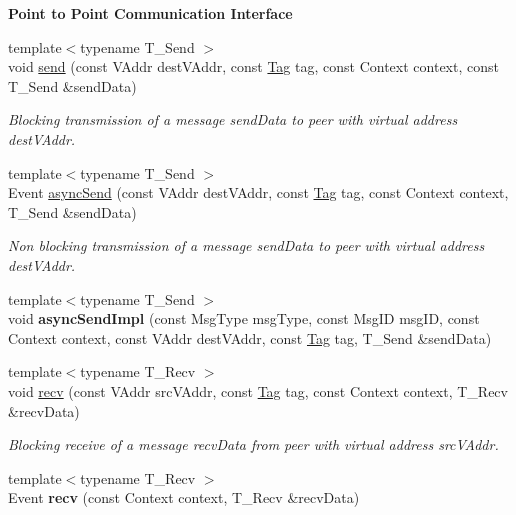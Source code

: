 \begin{Indent}{\bf Point to Point Communication Interface}\par
\begin{DoxyCompactItemize}
\item 
{\footnotesize template$<$typename T\+\_\+\+Send $>$ }\\void \hyperlink{structgraybat_1_1communicationPolicy_1_1ZMQ_a0b0b0a5a6f6b5c85a6c5b5b31fae6b1f}{send} (const V\+Addr dest\+V\+Addr, const \hyperlink{structTag}{Tag} tag, const Context context, const T\+\_\+\+Send \&send\+Data)
\begin{DoxyCompactList}\small\item\em Blocking transmission of a message send\+Data to peer with virtual address dest\+V\+Addr. \end{DoxyCompactList}\item 
{\footnotesize template$<$typename T\+\_\+\+Send $>$ }\\Event \hyperlink{structgraybat_1_1communicationPolicy_1_1ZMQ_a90e4cec7521e061aa682559d8bc72f1b}{async\+Send} (const V\+Addr dest\+V\+Addr, const \hyperlink{structTag}{Tag} tag, const Context context, T\+\_\+\+Send \&send\+Data)
\begin{DoxyCompactList}\small\item\em Non blocking transmission of a message send\+Data to peer with virtual address dest\+V\+Addr. \end{DoxyCompactList}\item 
\hypertarget{structgraybat_1_1communicationPolicy_1_1ZMQ_aba035ac9e25e20c89581c2e9ebdcf477}{}{\footnotesize template$<$typename T\+\_\+\+Send $>$ }\\void {\bfseries async\+Send\+Impl} (const Msg\+Type msg\+Type, const Msg\+I\+D msg\+I\+D, const Context context, const V\+Addr dest\+V\+Addr, const \hyperlink{structTag}{Tag} tag, T\+\_\+\+Send \&send\+Data)\label{structgraybat_1_1communicationPolicy_1_1ZMQ_aba035ac9e25e20c89581c2e9ebdcf477}

\item 
{\footnotesize template$<$typename T\+\_\+\+Recv $>$ }\\void \hyperlink{structgraybat_1_1communicationPolicy_1_1ZMQ_aed8fd6ad0f54a44d576f71e812064b17}{recv} (const V\+Addr src\+V\+Addr, const \hyperlink{structTag}{Tag} tag, const Context context, T\+\_\+\+Recv \&recv\+Data)
\begin{DoxyCompactList}\small\item\em Blocking receive of a message recv\+Data from peer with virtual address src\+V\+Addr. \end{DoxyCompactList}\item 
\hypertarget{structgraybat_1_1communicationPolicy_1_1ZMQ_a90e24f2d8431d0289d2067ed6a02f64c}{}{\footnotesize template$<$typename T\+\_\+\+Recv $>$ }\\Event {\bfseries recv} (const Context context, T\+\_\+\+Recv \&recv\+Data)\label{structgraybat_1_1communicationPolicy_1_1ZMQ_a90e24f2d8431d0289d2067ed6a02f64c}


\end{DoxyCompactItemize}
\end{Indent}
